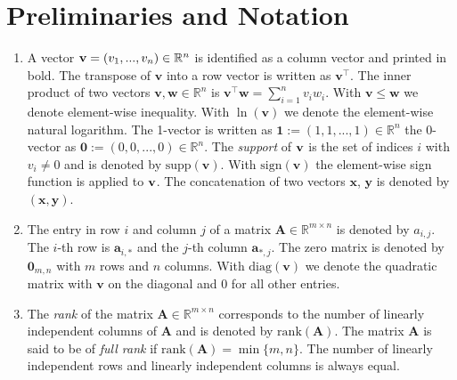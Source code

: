 \thispagestyle{plain}
\section*{Preliminaries and Notation}

\begin{enumerate}
    
    \item A vector $\bold{v} = (v_1, ..., v_n) \in \mathbb{R}^n$ is identified as a column vector and printed in bold. The transpose of $\mathbf v$ into a row vector is written as $\mathbf v^\intercal$. The inner product of two vectors $\mathbf v, \mathbf w \in \mathbb{R}^n$ is $\mathbf v^\intercal \mathbf w = \sum_{i=1}^n v_i w_i$. With $\mathbf v \leq \mathbf w$ we denote element-wise inequality. With $\ln (\mathbf v)$ we denote the element-wise natural logarithm. 
    The 1-vector is written as $\mathbf 1 := (1, 1, ..., 1) \in \mathbb{R}^n$ the 0-vector as $\mathbf 0 := (0, 0, ..., 0) \in \mathbb{R}^n$. The \textit{support} of $\bold{v}$ is the set of indices $i$ with $v_i \neq 0$ and is denoted by $\text{supp}(\mathbf v)$. With $\text{sign}(\mathbf v)$ the element-wise sign function is applied to $\bold v$.
    The concatenation of two vectors $\mathbf x$, $\mathbf y$ is denoted by $(\mathbf x, \mathbf y)$.

    \item The entry in row $i$ and column $j$ of a matrix $ \mathbf A \in \mathbb{R}^{m \times n}$ is denoted by $a_{i,j}$. The $i$-th row is $\boldsymbol a_{i,*}$ and the $j$-th column $\boldsymbol a_{*,j}$. %
    The zero matrix is denoted by $\mathbf 0_{m,n}$ with $m$ rows and $n$ columns. With $\text{diag}(\mathbf v)$ we denote the quadratic matrix with $\mathbf v$ on the diagonal and 0 for all other entries.
    
    \item The \textit{rank} of the matrix $\mathbf A \in \mathbb{R}^{m \times n}$ corresponds to the number of linearly independent columns of $\mathbf A$ and is denoted by $\text{rank}(\mathbf A)$. The matrix $\mathbf A$ is said to be of \textit{full rank} if $\text{rank}(\mathbf A) = \min \{ m, n\}$. The number of linearly independent rows and linearly independent columns is always equal.
    

\end{enumerate}
